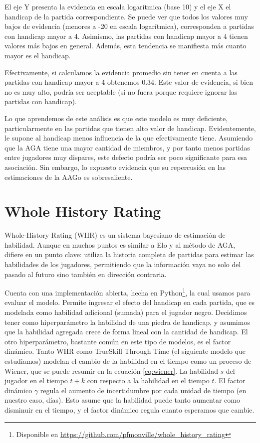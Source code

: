 \documentclass[a4paper,10pt]{report}
\begin{document}
El eje Y presenta la evidencia en escala logarítmica (base 10) y el eje X el handicap de la partida correspondiente.
Se puede ver que todos los valores muy bajos de evidencia (menores a -20 en escala logarítmica), corresponden a partidas con handicap mayor a 4.
Asimismo, las partidas con handicap mayor a 4 tienen valores más bajos en general.
Además, esta tendencia se manifiesta más cuanto mayor es el handicap.

Efectivamente, si calculamos la evidencia promedio sin tener en cuenta a las partidas con handicap mayor a 4 obtenemos 0.34.
Este valor de evidencia, si bien no es muy alto, podría ser aceptable (si no fuera porque requiere ignorar las partidas con handicap).

Lo que aprendemos de este análisis es que este modelo es muy deficiente, particularmente en las partidas que tienen alto valor de handicap.
Evidentemente, le supone al handicap menos influencia de la que efectivamente tiene.
Asumiendo que la AGA tiene una mayor cantidad de miembros, y por tanto menos partidas entre jugadores muy dispares, este defecto podría ser poco significante para esa asociación.
Sin embargo, lo expuesto evidencia %
que su repercusión en las estimaciones de la AAGo es sobresaliente.




\section*{Whole History Rating}

Whole-History Rating (WHR)  es un sistema bayesiano de estimación de habilidad.
Aunque en muchos puntos es similar a Elo y al método de AGA, difiere en un punto clave: utiliza la historia completa de partidas para estimar las habilidades de los jugadores, permitiendo que la información vaya no solo del pasado al futuro sino también en dirección contraria.

Cuenta con una implementación abierta, hecha en Python\footnote{Disponible en \url{https://github.com/pfmonville/whole_history_rating}}, la cual usamos para evaluar el modelo.
Permite ingresar el efecto del handicap en cada partida, que es modelada como habilidad adicional (sumada) para el jugador negro.
Decidimos tener como hiperparámetro la habilidad de una piedra de handicap, y asumimos que la habilidad agregada crece de forma lineal con la cantidad de handicap.
El otro hiperparámetro, bastante común en este tipo de modelos, es el factor dinámico.
Tanto WHR como TrueSkill Through Time (el siguiente modelo que estudiamos) modelan el cambio de la habilidad en el tiempo como un proceso de Wiener, que se puede resumir en la ecuación \ref{eq:wiener}.
La habilidad $s$ del jugador en el tiempo $t+k$ con respecto a la habilidad en el tiempo $t$.
El factor dinámico $\gamma$ regula el aumento de incertidumbre por cada unidad de tiempo (en nuestro caso, días).
Esto asume que la habilidad puede tanto aumentar como disminuir en el tiempo, y el factor dinámico regula cuanto esperamos que cambie.
\end{document}
